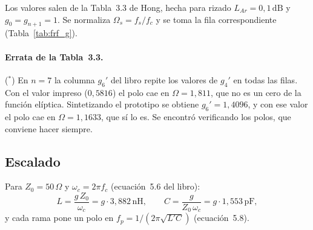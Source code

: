 Los valores salen de la Tabla~3.3 de Hong, hecha para rizado
$L_{Ar} = 0{,}1\,\text{dB}$ y $g_0 = g_{n+1} = 1$. Se normaliza
$\Omega_s = f_s/f_c$ y se toma la fila correspondiente
(Tabla~\ref{tab:frf_g}).

\begin{table}[htbp]
  \centering
  \caption{Valores del prototipo usados (Hong, Tabla~3.3, $\Omega_s = 1{,}1494$).}
  \label{tab:frf_g}
  \small
\end{table}

\paragraph{Errata de la Tabla~3.3.} ($^*$) En $n = 7$ la columna $g_6'$ del
libro repite los valores de $g_4'$ en todas las filas. Con el valor impreso
($0{,}5816$) el polo cae en $\Omega = 1{,}811$, que no es un cero de la
función elíptica. Sintetizando el prototipo se obtiene $g_6' = 1{,}4096$, y
con ese valor el polo cae en $\Omega = 1{,}1633$, que sí lo es. Se encontró
verificando los polos, que conviene hacer siempre.

\subsection{Escalado}

Para $Z_0 = 50\,\Omega$ y $\omega_c = 2\pi f_c$ (ecuación~5.6 del libro):
\begin{equation}
  L = \frac{g\,Z_0}{\omega_c} = g \cdot 3{,}882\,\text{nH}, \qquad
  C = \frac{g}{Z_0\,\omega_c} = g \cdot 1{,}553\,\text{pF},
\end{equation}
y cada rama pone un polo en $f_p = 1/(2\pi\sqrt{L'C})$ (ecuación~5.8).


